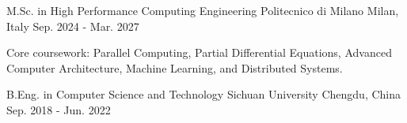 

\begin{cventries}

  \cventry
    {M.Sc. in High Performance Computing Engineering}
    {Politecnico di Milano}
    {Milan, Italy}
    {Sep. 2024 - Mar. 2027}
    {
      \begin{cvitems}
        \item {Core coursework: Parallel Computing, Partial Differential Equations, Advanced Computer Architecture, Machine Learning, and Distributed Systems.}
      \end{cvitems}
    }

  \cventry
    {B.Eng. in Computer Science and Technology}
    {Sichuan University}
    {Chengdu, China}
    {Sep. 2018 - Jun. 2022}
    {}

\end{cventries}
